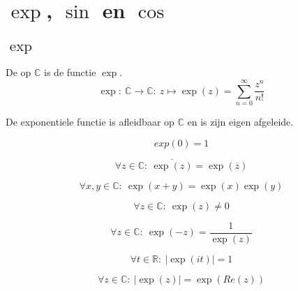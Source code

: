 \documentclass[main.tex]{subfiles}
\begin{document}
\section{$\exp$, $\sin$ en $\cos$}
\label{sec:exp-sin-en}

\subsection{$\exp$}
\label{sec:exp}

\begin{de}
  De  op $\mathbb{C}$ is de functie $\exp$.
  \[ \exp:\ \mathbb{C} \rightarrow \mathbb{C}:\ z \mapsto \exp(z) = \sum_{n=0}^{\infty}\frac{z^{n}}{n!} \]
\end{de}


\begin{bst}
  De exponentiele functie is afleidbaar op $\mathbb{C}$ en is zijn eigen afgeleide.
\end{bst}

\begin{bpr}
  \[ exp(0) = 1 \]
\end{bpr}

\begin{bpr}
  \[ \forall z \in \mathbb{C}:\ \overline{\exp(z)} = \exp(\overline{z}) \]
\end{bpr}

\begin{bpr}
  \[ \forall x,y \in \mathbb{C}:\ \exp(x+y) = \exp(x)\exp(y) \]
\end{bpr}

\begin{bpr}
  \[ \forall z \in \mathbb{C}:\ \exp(z) \neq 0 \]
\end{bpr}

\begin{bpr}
  \[ \forall z \in \mathbb{C}:\ \exp(-z) = \frac{1}{\exp(z)} \]
\end{bpr}

\begin{bpr}
  \[ \forall t \in \mathbb{R}:\ |\exp(it)| = 1 \]
\end{bpr}

\begin{bpr}
  \[ \forall z \in \mathbb{C}:\ |\exp(z)| = \exp(Re(z)) \]
\end{bpr}
\end{document}
